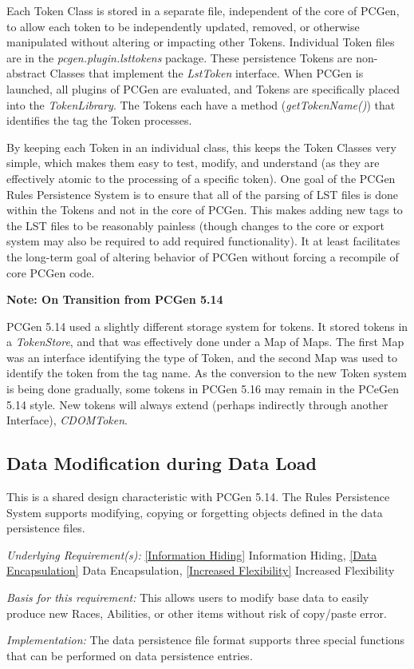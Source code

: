 \documentclass[12pt,letterpaper]{article}
\newcommand{\pcgenversEOS}{5.16}
\newcommand{\systemEOS}{Rules Persistence System}
\newcommand{\system}{\systemEOS{} }
\newcommand{\pcgenvers}{\pcgenversEOS{} }
\newcommand{\textem}[1]{\emph{#1}}
\newcommand{\lsubsection}[1]{\label{#1}\subsection{#1}}
\newcommand{\myref}[1]{\ref{#1} #1}
\newcommand{\sidebar}[5]{
\noindent
\definecolor{shadecolor}{#2}{#3}
\begin{minipage}{\textwidth}
\setlength{\parskip}{-11pt}
\begin{shaded}\textbf{#1: #4}\end{shaded}
\begin{boxedminipage}{\textwidth}
#5
\end{boxedminipage}
\end{minipage}
}
\newcommand{\sbnote}[2]{\sidebar{Note}{gray}{0.9}{#1}{#2}}
\newcommand{\basis}{\noindent\textem{Basis for this requirement:} }
\newcommand{\impl}{\noindent\textem{Implementation:} }
\newcommand{\under}{\noindent\textem{Underlying Requirement(s):} }
\begin{document}
Each Token Class is stored in a separate file, independent of the core of PCGen, to allow each 
token to be independently updated, removed, or otherwise manipulated without altering or
impacting other Tokens.  Individual Token files are in the \textem{pcgen.plugin.lsttokens} package. 
These persistence Tokens are non-abstract Classes that
implement the \textem{LstToken} interface.  When PCGen is launched, all plugins of PCGen are 
evaluated, and Tokens are specifically placed into the \textem{TokenLibrary}.  The Tokens each
have a method (\textem{getTokenName()}) that identifies the tag the Token processes.

By keeping each Token in an individual class, this keeps the Token Classes very simple,
which makes them easy to test, modify, and understand (as they are effectively atomic to the
processing of a specific token).  One goal of the PCGen \system is to ensure that all of the
parsing of LST files is done within the Tokens and not in the core of PCGen.  This makes
adding new tags to the LST files to be reasonably painless (though changes to the core or
export system may also be required to add required functionality).   It at least facilitates
the long-term goal of altering behavior of PCGen without forcing a recompile of core PCGen
code.

\sbnote{On Transition from PCGen 5.14}{PCGen 5.14 used a slightly different storage system
for tokens.  It stored tokens in a \textem{TokenStore}, and that was effectively done under 
a Map of Maps.  The first Map was an interface identifying the type of Token, and the second 
Map was used to identify the token from the tag name.  As the conversion to the new Token
system is being done gradually, some tokens in PCGen \pcgenvers may remain in the PCeGen 5.14 
style.  New tokens will always extend (perhaps indirectly through another Interface),
\textem{CDOMToken}.}

\lsubsection{Data Modification during Data Load}

This is a shared design characteristic with PCGen 5.14.  The \system supports
modifying, copying or forgetting objects defined in the data persistence files.

\under \myref{Information Hiding}, \myref{Data Encapsulation}, \myref{Increased Flexibility}

\basis This allows users to modify base data to easily produce new Races, Abilities, or other items
without risk of copy/paste error.

\impl The data persistence file format supports three special functions that can be performed
on data persistence entries.
\end{document}
